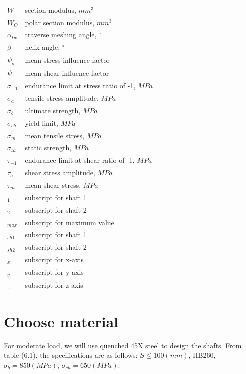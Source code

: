 \begin{tabular}[t]{lp{6.5cm}}
	$ W $ & section modulus, $ \unit{mm^3} $\\
	$ W_O $ & polar section modulus, $ \unit{mm^3} $\\
	$ \alpha_{tw} $ & traverse meshing angle, $ ^\circ $\\
	$ \beta $ & helix angle, $ ^\circ $\\
	$ \psi_\sigma $ & mean stress influence factor\\
	$ \psi_\tau $ & mean shear influence factor\\
	$ \sigma_{-1} $ & endurance limit at stress ratio of -1, $ \unit{MPa} $\\
	$ \sigma_a $ & tensile stress amplitude, $ \unit{MPa} $\\
	$ \sigma_b $ & ultimate strength, $ \unit{MPa} $\\
	$ \sigma_{ch} $ & yield limit, $ \unit{MPa} $\\
	$ \sigma_m $ & mean tensile stress, $ \unit{MPa} $\\
	$ \sigma_{td} $ & static strength, $ \unit{MPa} $\\
	$ \tau_{-1} $ & endurance limit at shear ratio of -1, $ \unit{MPa} $\\
	$ \tau_a $ & shear stress amplitude, $ \unit{MPa} $\\
	$ \tau_m $ & mean shear stress, $ \unit{MPa} $\\
	$ _1 $ & subscript for shaft 1\\
	$ _2 $ & subscript for shaft 2\\
	$ _{max} $ & subscript for maximum value\\
	$ _{sh1} $ & subscript for shaft 1\\
	$ _{sh2} $ & subscript for shaft 2\\
	$ _x $ & subscript for x-axis\\
	$ _y $ & subscript for y-axis\\
	$ _z $ & subscript for z-axis\\
\end{tabular}

\section{Choose material}
For moderate load, we will use quenched 45X steel to design the shafts. From table (6.1), the specifications are as follows: $ S \leq 100\unit{(mm)} $, HB260, $ \sigma_b = 850\unit{(MPa)}$, $ \sigma_{ch} = 650\unit{(MPa)}$. 

